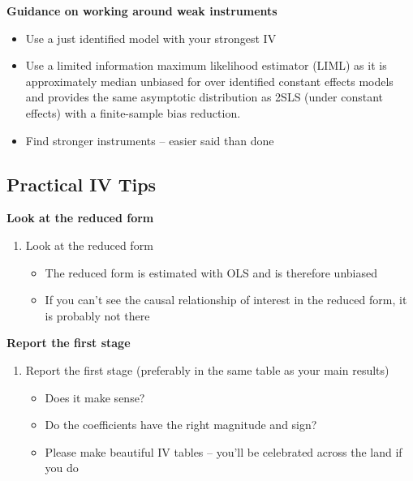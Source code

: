 \documentclass[notes=show]{beamer}
\begin{document}
\begin{frame}[plain]

	\begin{center}
	\textbf{Guidance on working around weak instruments}
	\end{center}
	
		\begin{itemize}
		\item Use a just identified model with your strongest IV
		\item Use a limited information maximum likelihood estimator (LIML) as it is approximately median unbiased for over identified constant effects models and provides the same asymptotic distribution as 2SLS (under constant effects) with a finite-sample bias reduction. 
		\item Find stronger instruments -- easier said than done
		\end{itemize}
\end{frame}


\subsection{Practical IV Tips}


\begin{frame}
\begin{center}
\textbf{Look at the reduced form}
\end{center}

\begin{enumerate}
	\item Look at the reduced form
		\begin{itemize}
		\item The reduced form is estimated with OLS and is therefore unbiased
		\item If you can't see the causal relationship of interest in the reduced form, it is probably not there
		\end{itemize}
\end{enumerate}

\end{frame}

\begin{frame}[plain]
	\begin{center}
	\textbf{Report the first stage}
	\end{center}
	
	\begin{enumerate}\addtocounter{enumi}{1}
	\item Report the first stage (preferably in the same table as your main results)
		\begin{itemize}
		\item Does it make sense?
		\item Do the coefficients have the right magnitude and sign?
		\item Please make beautiful IV tables -- you'll be celebrated across the land if you do
		\end{itemize}
	\end{enumerate}
\end{frame}
\end{document}
